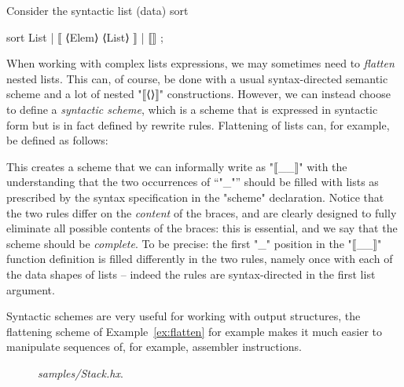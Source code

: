 \documentclass[11pt]{article} %
\begin{document}
\begin{example}\label{ex:flatten}
  Consider the syntactic list (data) sort
  \begin{hacs}[xleftmargin=\parindent,xrightmargin=\parindent]
sort List | ⟦ ⟨Elem⟩ ⟨List⟩ ⟧ | ⟦⟧ ;
  \end{hacs}
  When working with complex lists expressions, we may sometimes need to \emph{flatten} nested
  lists. This can, of course, be done with a usual syntax-directed semantic scheme and a lot of
  nested "⟦⟨⟩⟧" constructions. However, we can instead choose to define a \emph{syntactic scheme},
  which is a scheme that is expressed in syntactic form but is in fact defined by rewrite
  rules. Flattening of lists can, for example, be defined as follows:
  This creates a scheme that we can informally write as "⟦{_}_⟧" with the understanding that the
  two occurrences of ``"_"'' should be filled with lists as prescribed by the syntax specification
  in the "scheme" declaration. Notice that the two rules differ on the \emph{content} of the braces,
  and are clearly designed to fully eliminate all possible contents of the braces: this is
  essential, and we say that the scheme should be \emph{complete}. To be precise: the first "_"
  position in the "⟦{_}_⟧" function definition is filled differently in the two rules, namely once
  with each of the data shapes of lists -- indeed the rules are syntax-directed in the first list
  argument.
\end{example}

Syntactic schemes are very useful for working with output structures, the flattening scheme of
Example~\ref{ex:flatten} for example makes it much easier to manipulate sequences of, for example,
assembler instructions.

\begin{figure}[p]
  \caption{\emph{samples/Stack.hx}.}
  \label{fig:stack}
\end{figure}
\end{document}
